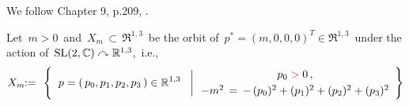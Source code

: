 
We follow Chapter 9, p.209, \cite{Talagrand2022}.

\vskip 0.5cm
\noindent
Let \,$m > 0$\, and
\,$X_{m} \,\subset\, \Re^{1,3}$\,
be the orbit of
\,$p^{*} = (m,0,0,0)^{T} \in \Re^{1,3}$\,
under the action of
\,$\textnormal{SL}(2,\mathbb{C}) \curvearrowright \mathbb{R}^{1,3}$,\,
i.e.,
\begin{eqnarray*}
X_{m}
& \!\! := \!\! &
	\left\{\;\,
		\left.
		p = (\,p_{0},p_{1},p_{2},p_{3}\,)
		\overset{{\color{white}1}}{\in}
		\Re^{1,3}
		\;\;\;\right\vert
		\begin{array}{c}
			p_{0} \;{\color{red}>}\; 0\,,
			\\
			-m^{2} \, \overset{{\color{white}1}}{=} \, -\,(p_{0})^{2} + (p_{1})^{2} + (p_{2})^{2} + (p_{3})^{2}
			\end{array}
		\right\}
\end{eqnarray*}

